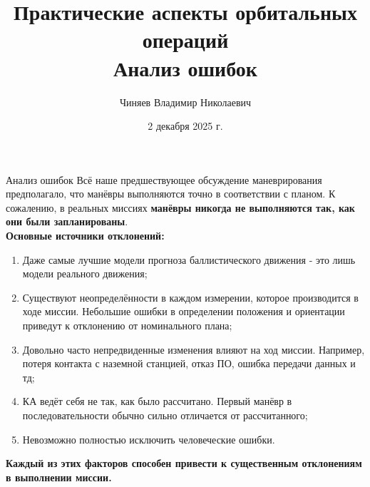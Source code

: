 \documentclass[8pt]{beamer}
\author[Автор]{Чиняев Владимир Николаевич}
\title{Практические аспекты орбитальных операций \\ Анализ ошибок}
\institute[]{Московский физико технический институт}
\date{2 декабря 2025 г.}
\begin{document}
\begin{frame}
\titlepage
\end{frame}

\begin{frame}{Анализ ошибок}
Всё наше предшествующее обсуждение маневрирования предполагало, что манёвры выполняются точно в соответствии с планом. К сожалению, в реальных миссиях \textbf{манёвры никогда не выполняются так, как они были запланированы}. \\
\smallskip
\textbf{Основные источники отклонений:}
\begin{enumerate}
    \item Даже самые лучшие модели прогноза баллистического движения - это лишь модели реального движения;
    \item Существуют неопределённости в каждом измерении, которое производится в ходе миссии. Небольшие ошибки в определении положения и ориентации приведут к отклонению от номинального плана;
    \item Довольно часто непредвиденные изменения влияют на ход миссии. Например, потеря контакта с наземной станцией, отказ ПО, ошибка передачи данных и тд;
    \item КА ведёт себя не так, как было рассчитано. Первый манёвр в последовательности обычно сильно отличается от рассчитанного;
    \item Невозможно полностью исключить человеческие ошибки.
\end{enumerate}

\textbf{Каждый из этих факторов способен привести к существенным отклонениям в выполнении миссии.}
\end{frame}
\end{document}
